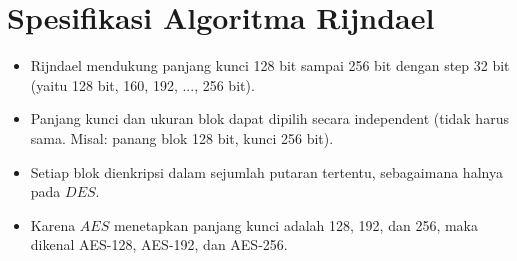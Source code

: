 \documentclass{article}
\begin{document}

\section*{Spesifikasi Algoritma Rijndael}

\begin{itemize}
    \item Rijndael mendukung panjang kunci 128 bit sampai 256 bit dengan step 32 bit (yaitu 128 bit, 160, 192, ..., 256 bit).
    \item Panjang kunci dan ukuran blok dapat dipilih secara independent (tidak harus sama. Misal: panang blok 128 bit, kunci 256 bit).
    \item Setiap blok dienkripsi dalam sejumlah putaran tertentu, sebagaimana halnya pada $DES$.
    \item Karena $AES$ menetapkan panjang kunci adalah 128, 192, dan 256, maka dikenal AES-128, AES-192, dan AES-256.
\end{itemize}
\end{document}
